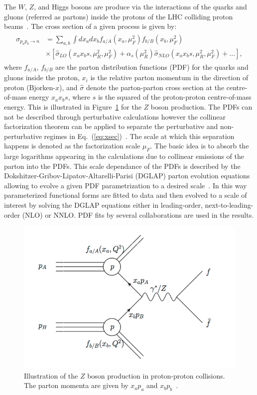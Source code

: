 The $W$, $Z$, and Higgs bosons are produce via the interactions of the quarks and gluons (referred as partons) inside the protons of the LHC colliding proton beams~\cite{Bloom:1969kc,Breidenbach:1969kd}. The cross section of a given process is given by:
\begin{eqnarray} \label{eq:xsec}
\begin{aligned}
\sigma_{p_ap_b \rightarrow n} &= \sum_{a,b} \int dx_a dx_b f_{a/A}(x_a,\mu_{F}^2) f_{b/B}(x_{b},\mu_{F}^2)  \\ 
& \times [\hat{\sigma}_{LO}(x_ax_bs,\mu_R^2,\mu_F^2)+\alpha_s(\mu_R^2)\hat{\sigma}_{NLO}(x_ax_bs,\mu_R^2,\mu_F^2)+...],
\end{aligned}
\end{eqnarray}   
where $f_{a/A}$, $f_{b/B}$ are the parton distribution functions (PDF) for the quarks and gluons inside the proton, $x_i$ is the relative parton momentum in the direction of proton (Bjorken-$x$), and $\hat{\sigma}$ denote the parton-parton cross section at the centre-of-mass energy $x_{a}x_{b}s$, where $s$ is the squared of the proton-proton centre-of-mass energy.  This is illustrated in Figure~\ref{fig:lhc_collision} for the $Z$ boson production. The PDFs can not be described through perturbative calculations however the collinear factorization theorem can be applied to separate the perturbative and non-perturbative regimes in Eq.~(\ref{eq:xsec})~\cite{Collins:1989gx}. The scale at which this separation happens is denoted as the factorization scale $\mu_{F}$. The basic idea is to absorb the large logarithms appearing in the calculations due to collinear emissions of the parton into the PDFs. This scale dependance of the PDFs is described by the Dokshitzer-Gribov-Lipatov-Altarelli-Parisi (DGLAP) parton evolution equations allowing to evolve a given PDF parametrization to a desired scale~\cite{Gribov:1972ri,Altarelli:1977zs,Dokshitzer:1977sg}. In this way parameterized functional forms are fitted to data and then evolved to a scale of interest by solving the DGLAP equations either in leading-order, next-to-leading-order (NLO) or NNLO. PDF fits by several collaborations are used in the results.

\begin{figure}[h]
\centering
\includegraphics[width=0.60\columnwidth]{figures_chapter2/lhc_cross}
\caption{Illustration of the $Z$ boson production in proton-proton collisions. The parton momenta are given by $x_ap_a$ and $x_bp_b$~\cite{Schott:2014sea}.}
\label{fig:lhc_collision}
\end{figure} 

